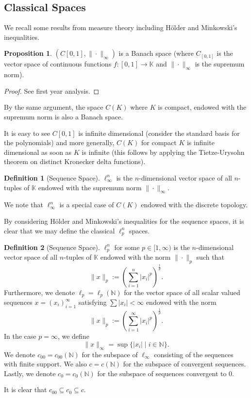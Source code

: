 \documentclass[
]{article}
\theoremstyle{definition}
\theoremstyle{definition}
\newtheorem{definition}{Definition}[section]
\newtheorem{proposition}{Proposition}[section]
\begin{document}
\subsection{Classical Spaces}

We recall some results from measure theory including Hölder and Minkowski's 
inequalities. 

\begin{proposition}
  \((C[0, 1], \|\cdot\|_\infty)\) is a Banach space (where \(C_[0, 1]\) is the 
  vector space of continuous functions \(f : [0, 1] \to \mathbb{K}\) and 
  \(\|\cdot\|_\infty\) is the supremum norm).
\end{proposition}
\begin{proof}
  See first year analysis.
\end{proof}

By the same argument, the space \(C(K)\) where \(K\) is compact, endowed with 
the supremum norm is also a Banach space.

It is easy to see \(C[0, 1]\) is infinite dimensional (consider the standard 
basis for the polynomials) and more generally, \(C(K)\) for compact \(K\) is 
infinite dimensional as soon as \(K\) is infinite (this follows by applying 
the Tietze-Urysohn theorem on distinct Kronecker delta functions).

\begin{definition}[Sequence Space]
  \(\ell^n_\infty\) is the \(n\)-dimensional vector space of all 
  \(n\)-tuples of \(\mathbb{K}\) endowed with the supremum norm 
  \(\|\cdot\|_\infty\).
\end{definition}

We note that \(\ell^n_\infty\) is a special case of \(C(K)\) endowed with the 
discrete topology.

By considering Hölder and Minkowski's inequalities for the sequence spaces, 
it is clear that we may define the classical \(\ell^n_p\) spaces.

\begin{definition}[Sequence Space]
  \(\ell^n_p\) for some \(p \in [1, \infty)\) is the \(n\)-dimensional vector 
  space of all \(n\)-tuples of \(\mathbb{K}\) endowed with the norm 
  \(\|\cdot\|_p\) such that 
  \[\|x\|_p := \left(\sum_{i = 1}^n |x_i|^p \right)^{\frac{1}{p}}.\]
  Furthermore, we denote \(\ell_p = \ell_p(\mathbb{N})\) for the vector space 
  of all scalar valued sequences \(x = (x_i)_{i = 1}^\infty\) satisfying 
  \(\sum |x_i| < \infty\) endowed with the norm  
  \[\|x\|_p := \left(\sum_{i = 1}^\infty |x_i|^p \right)^{\frac{1}{p}}.\]
  In the case \(p = \infty\), we define 
  \[\|x\|_\infty = \sup\{|x_i| \mid i \in \mathbb{N}\}.\]
  We denote \(c_{00} = c_{00}(\mathbb{N})\) for the subspace of \(\ell_\infty\) 
  consisting of the sequences with finite support. We also \(c = c(\mathbb{N})\) 
  for the subspace of convergent sequences. Lastly, we denote 
  \(c_0 = c_0(\mathbb{N})\) for the subspace of sequences convergent to 0.

  It is clear that \(c_{00} \subseteq c_0 \subseteq c\).
\end{definition}
\end{document}
